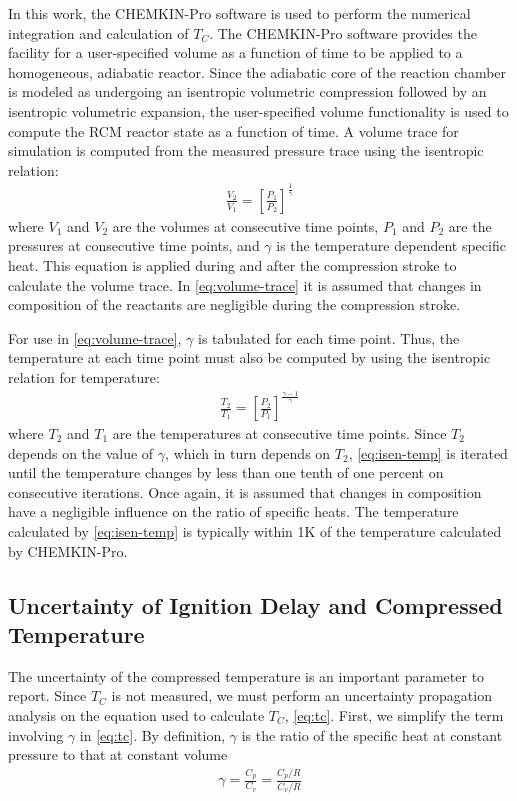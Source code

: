 \documentclass[12pt, letterpaper]{article}
\begin{document}
In this work, the CHEMKIN-Pro \cite{Chemkin2012} software is used to
perform the numerical integration and calculation of $T_C$. The
CHEMKIN-Pro software provides the facility for a user-specified
volume as a function of time to be applied to a homogeneous,
adiabatic reactor. Since the adiabatic core of the reaction chamber
is modeled as undergoing an isentropic volumetric compression followed
by an isentropic volumetric expansion, the user-specified volume
functionality is used to compute the RCM reactor state as a function
of time. A volume trace for simulation is computed from the measured
pressure trace using the isentropic relation:
%
\begin{align}
\frac{V_2}{V_1} = \left[\frac{P_1}{P_2}\right]^{\frac{1}{\gamma}}
\label{eq:volume-trace}
\end{align}
%
where $V_1$ and $V_2$ are the volumes at consecutive time points,
$P_1$ and $P_2$ are the pressures at consecutive time points, and
$\gamma$ is the temperature dependent specific heat. This equation
is applied during and after the compression stroke to calculate
the volume trace. In \autoref{eq:volume-trace} it is assumed that
changes in composition of the reactants are negligible during the
compression stroke.

For use in \autoref{eq:volume-trace}, $\gamma$ is tabulated for each
time point. Thus, the temperature at each time point must also be
computed by using the isentropic relation for temperature:
%
\begin{align}
\frac{T_2}{T_1} = \left[\frac{P_2}{P_1}\right]^{\frac{\gamma-1}{\gamma}}
\label{eq:isen-temp}
\end{align}
%
where $T_2$ and $T_1$ are the temperatures at consecutive time points.
Since $T_2$ depends on the value of $\gamma$, which in turn depends
on $T_2$, \autoref{eq:isen-temp} is iterated until the temperature
changes by less than one tenth of one percent on consecutive iterations.
Once again, it is assumed that changes in composition have a negligible
influence on the ratio of specific heats.
The temperature calculated by \autoref{eq:isen-temp} is typically within
1K of the temperature calculated by CHEMKIN-Pro.

\subsection{Uncertainty of Ignition Delay and Compressed Temperature}
\label{sec:uncertainty}

The uncertainty of the compressed temperature is an important parameter
to report. Since $T_C$ is not measured, we must perform an uncertainty
propagation analysis on the equation used to calculate $T_C$,
\autoref{eq:tc}. First, we simplify the term involving $\gamma$ in
\autoref{eq:tc}. By definition, $\gamma$ is the ratio of the specific heat
at constant pressure to that at constant volume
%
\begin{align}
\gamma = \frac{C_p}{C_v} = \frac{C_p/R}{C_v/R}
\end{align}
\end{document}
